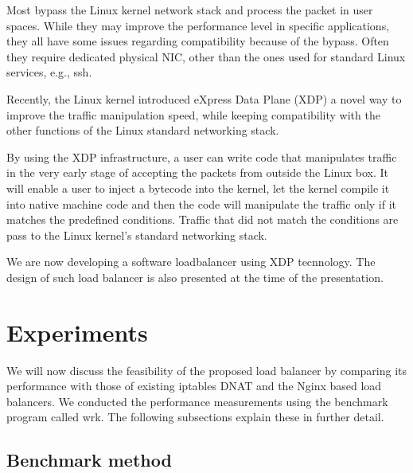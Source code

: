 Most bypass the Linux kernel network stack and process the packet in user spaces.
While they may improve the performance level in specific applications, they all have some issues regarding compatibility because of the bypass.
Often they require dedicated physical NIC, other than the ones used for standard Linux services, e.g., ssh.


Recently, the Linux kernel introduced eXpress Data Plane (XDP)\cite{bertin2017xdp} a novel way to improve the traffic manipulation speed, while keeping compatibility with the other functions of the Linux standard networking stack.

By using the XDP infrastructure, a user can write code that manipulates traffic in the very early stage of accepting the packets from outside the Linux box.
It will enable a user to inject a bytecode into the kernel, let the kernel compile it into native machine code and then the code will manipulate the traffic only if it matches the predefined conditions.
Traffic that did not match the conditions are pass to the Linux kernel's standard networking stack.

We are now developing a software loadbalancer using XDP tecnnology.
The design of such load balancer is also presented at the time of the presentation.

\section{Experiments}\label{Experiments}

We will now discuss the feasibility of the proposed load balancer by comparing 
its performance with those of existing iptables DNAT and the Nginx based load balancers. 
We conducted the performance measurements using the benchmark program called wrk\cite{Glozer2016}.
The following subsections explain these in further detail. 

\subsection{Benchmark method}

